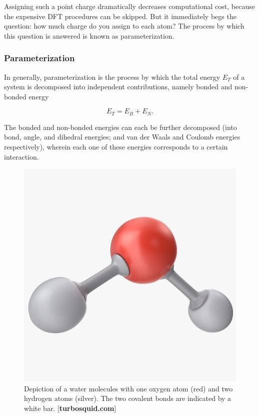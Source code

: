     Assigning such a point charge dramatically decreases computational cost, because the expensive DFT procedures can be skipped. But it immediately begs the question: how much charge do you assign to each atom? The process by which this question is answered is known as parameterization.
    
        \subsubsection{Parameterization}
        
        In generally, parameterization is the process by which the total energy $E_T$ of a system is decomposed into independent contributions, namely bonded and non-bonded energy
        
        \begin{equation}
            E_T = E_B + E_N.
        \end{equation}
        
        \noindent The bonded and non-bonded energies can each be further decomposed (into bond, angle, and dihedral energies; and van der Waals and Coulomb energies respectively), wherein each one of these energies corresponds to a certain interaction.
        
        \begin{figure}
            \centering
            \includegraphics[width=0.7\linewidth]{Figures/System/water-molecule.jpg}
            \caption{Depiction of a water molecules with one oxygen atom (red) and two hydrogen atoms (silver). The two covalent bonds are indicated by a white bar. [\textbf{turbosquid.com}]}
            \label{fig:water_molecule}
        \end{figure}
        
